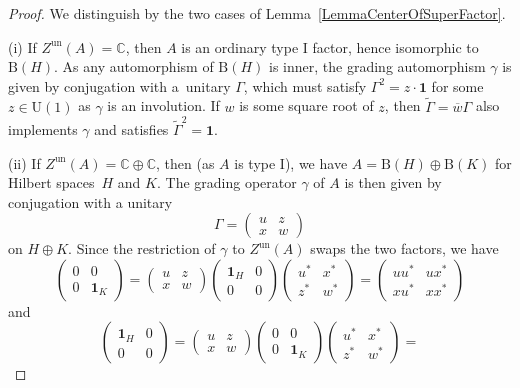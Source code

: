 \documentclass[11pt]{article}
\numberwithin{equation}{section}
\numberwithin{equation}{section}
\newcommand{\C}{\mathbb{C}}
\newcommand{\B}{\mathrm{B}}
\newcommand{\U}{\mathrm{U}}
\begin{document}
\begin{proof}
We distinguish by the two cases of Lemma~\ref{LemmaCenterOfSuperFactor}.

(i) If $Z^{\mathrm{un}}(A) = \C$, then $A$ is an ordinary type I factor, hence isomorphic to $\B(H)$.
As any automorphism of $\B(H)$ is inner, the grading automorphism $\gamma$ is given by conjugation with a~unitary $\Gamma$, which must satisfy $\Gamma^2 = z \cdot\mathbf{1}$ for some $z \in \U(1)$ as $\gamma$ is an involution.
If $w$ is some square root of $z$, then $\tilde{\Gamma} = \overline{w} \Gamma$ also implements $\gamma$ and satisfies $\tilde{\Gamma}^2 = \mathbf{1}$.

(ii) If $Z^{\mathrm{un}}(A) = \C \oplus \C$, then (as $A$ is type I), we have $A = \B(H) \oplus \B(K)$ for Hilbert spaces~$H$ and $K$.
The grading operator $\gamma$ of $A$ is then given by conjugation with a unitary
\begin{equation*}
 \Gamma = \begin{pmatrix} u & z \\ x & w \end{pmatrix}
\end{equation*}
on $H \oplus K$.
Since the restriction of $\gamma$ to $Z^{\mathrm{un}}(A)$ swaps the two factors, we have
\begin{equation*}
\begin{pmatrix} 0 & 0 \\ 0 & \mathbf{1}_K \end{pmatrix}
 = \begin{pmatrix} u & z \\ x & w \end{pmatrix}\begin{pmatrix} \mathbf{1}_H & 0 \\ 0 & 0 \end{pmatrix}\begin{pmatrix} u^* & x^* \\ z^* & w^* \end{pmatrix} =
 \begin{pmatrix} uu^* & u x^* \\ xu^* & xx^* \end{pmatrix}
 \end{equation*}
 and
 \begin{equation*}
\begin{pmatrix} \mathbf{1}_H & 0 \\ 0 & 0 \end{pmatrix}
 = \begin{pmatrix} u & z \\ x & w \end{pmatrix}\begin{pmatrix} 0 & 0 \\ 0 & \mathbf{1}_K \end{pmatrix}\begin{pmatrix} u^* & x^* \\ z^* & w^* \end{pmatrix} =

\end{equation*}
\end{proof}
\end{document}
